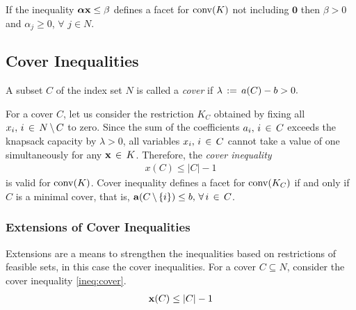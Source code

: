 \documentclass[10pt,twoside]{amsart}
\begin{document}
\begin{prop}
  If the inequality $\boldsymbol\alpha\mathbf{x} \leq \beta$ defines a facet for $\operatorname{conv}(K)$ not including $\mathbf{0}$ then $\beta > 0$ and $\alpha_j \geq 0$, $\forall\,\,j\in N$.
\end{prop}

\subsection{Cover Inequalities}
\begin{dfn}
  A subset $C$ of the index set $N$ is called a \textit{cover} if $\lambda \,:=\, a(C) - b > 0.$
\end{dfn}

For a cover $C$, let us consider the restriction $K_C$ obtained by fixing all $x_i,\, i\,\in\, N\,\backslash\, C$ to zero. Since the sum of the coefficients $a_i,\, i\,\in\, C$ exceeds the knapsack capacity by $\lambda > 0$, all variables $x_i,\, i\,\in\, C$ cannot take a value of one simultaneously for any $\mathbf{x} \,\in\, K$. Therefore, the \textit{cover inequality} \cite{Balas1975,Hammer1975,Wolsey1975}
\begin{align}
        x(C) \leq |C| - 1 \label{ineq:cover}
\end{align}
is valid for $\operatorname{conv}(K)$. Cover inequality defines a facet for $\operatorname{conv}(K_C)$ if and only if $C$ is a minimal cover, that is, $\mathbf{a}(C\,\backslash\, \{i\}) \leq b,\,\forall\,i\,\in\, C$.

\subsubsection{Extensions of Cover Inequalities}
\label{sec:extension}
\hfill

Extensions are a means to strengthen the inequalities based on restrictions of feasible sets, in this case the cover inequalities. For a cover $C \subseteq N$, consider the cover inequality \eqref{ineq:cover}.
\begin{align*}
        \mathbf{x}(C) \leq |C| - 1
\end{align*}
\end{document}
